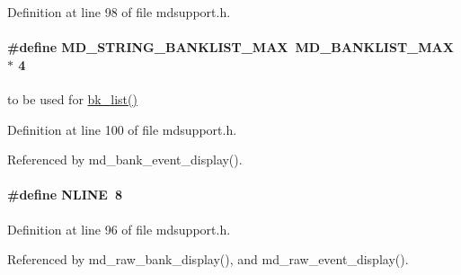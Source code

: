 Definition at line 98 of file mdsupport.h.
\paragraph[{MD\_\-STRING\_\-BANKLIST\_\-MAX}]{\setlength{\rightskip}{0pt plus 5cm}\#define MD\_\-STRING\_\-BANKLIST\_\-MAX~MD\_\-BANKLIST\_\-MAX $\ast$ 4}\hfill\label{group__mdsupportdefineh_ga25e499dd284b72f2b514e2f25f03d48b}
to be used for \hyperlink{group__bkfunctionc_ga4d8a0ef23239ae478544fa96a0e98a33}{bk\_\-list()} 

Definition at line 100 of file mdsupport.h.

Referenced by md\_\-bank\_\-event\_\-display().
\paragraph[{NLINE}]{\setlength{\rightskip}{0pt plus 5cm}\#define NLINE~8}\hfill\label{group__mdsupportdefineh_gad9a8135749728ad6e54977f88361f092}


Definition at line 96 of file mdsupport.h.

Referenced by md\_\-raw\_\-bank\_\-display(), and md\_\-raw\_\-event\_\-display().